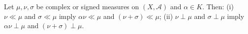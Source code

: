 Let $\mu, \nu, \sigma$ be complex or signed measures on $(X, \mathcal{A})$ and $\alpha \in K$. Then: (i) $\nu \ll \mu$ and $\sigma \ll \mu$ imply $\alpha\nu \ll \mu$ and $(\nu+\sigma) \ll \mu$; (ii) $\nu \perp \mu$ and $\sigma \perp \mu$ imply $\alpha\nu \perp \mu$ and $(\nu+\sigma) \perp \mu$.
